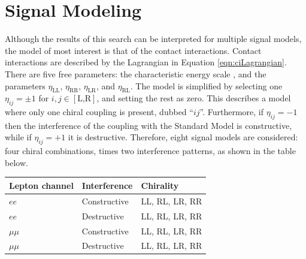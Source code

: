 \section{Signal Modeling}\label{sec:ciSig}

Although the results of this search can be interpreted for multiple signal models, the model of most interest is that of the \llqq contact interactions.
Contact interactions are described by the Lagrangian in Equation \ref{eqn:ciLagrangian}.
There are five free parameters: the characteristic energy scale \lam, and the parameters $\eta_\text{LL}$, $\eta_\text{RR}$, $\eta_\text{LR}$, and $\eta_\text{RL}$.
The model is simplified by selecting one $\eta_{ij}=\pm1$ for $i,j\in[\text{L,R}]$, and setting the rest as zero.
This describes a model where only one chiral coupling is present, dubbed ``$ij$''.
Furthermore, if $\eta_{ij}=-1$ then the interference of the coupling with the Standard Model is constructive, while if $\eta_{ij}=+1$ it is destructive.
Therefore, eight signal models are considered: four chiral combinations, times two interference patterns, as shown in the table below.
\begin{center}
\begin{tabular}{l l l}
  \toprule
  Lepton channel & Interference & Chirality \\
  \midrule
  $ee$ & Constructive & LL, RL, LR, RR \\
  $ee$ & Destructive & LL, RL, LR, RR \\
  $\mu\mu$ & Constructive & LL, RL, LR, RR \\
  $\mu\mu$ & Destructive & LL, RL, LR, RR \\
  \bottomrule
\end{tabular}
\end{center}


